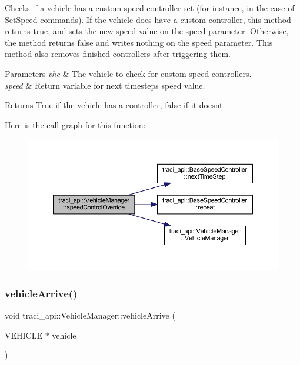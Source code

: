 Checks if a vehicle has a custom speed controller set (for instance, in the case of Set\+Speed commands). If the vehicle does have a custom controller, this method returns true, and sets the new speed value on the speed parameter. Otherwise, the method returns false and writes nothing on the speed parameter. This method also removes finished controllers after triggering them. 


\begin{DoxyParams}{Parameters}
{\em vhc} & The vehicle to check for custom speed controllers. \\
\hline
{\em speed} & Return variable for next timesteps speed value. \\
\hline
\end{DoxyParams}
\begin{DoxyReturn}{Returns}
True if the vehicle has a controller, false if it doesn\textquotesingle{}t. 
\end{DoxyReturn}
Here is the call graph for this function\+:\nopagebreak
\begin{figure}[H]
\begin{center}
\leavevmode
\includegraphics[width=350pt]{classtraci__api_1_1_vehicle_manager_acebd30eec75b857573c9237d9a15244f_cgraph}
\end{center}
\end{figure}
\mbox{\label{classtraci__api_1_1_vehicle_manager_a336d2616be8e4e0c9da5d29d7f122ad6}} 
\subsubsection{\texorpdfstring{vehicle\+Arrive()}{vehicleArrive()}}
{\footnotesize\ttfamily void traci\+\_\+api\+::\+Vehicle\+Manager\+::vehicle\+Arrive (\begin{DoxyParamCaption}\item[{V\+E\+H\+I\+C\+LE $\ast$}]{vehicle }\end{DoxyParamCaption})}



